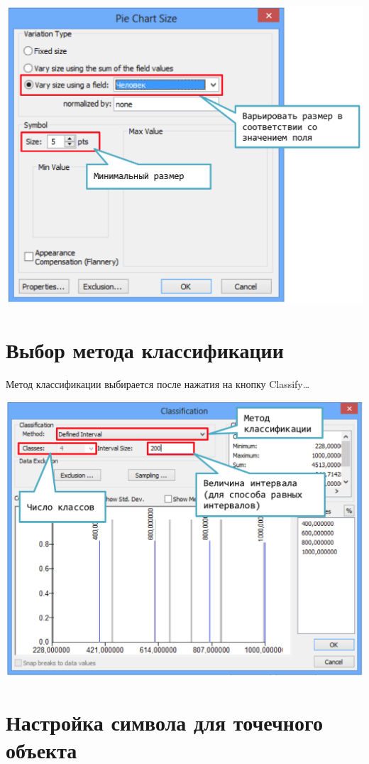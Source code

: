 \documentclass[]{book}
\theoremstyle{definition}
\theoremstyle{definition}
\theoremstyle{definition}
\theoremstyle{remark}
\begin{document}
\includegraphics{images/Appendix/image23.png}

\hypertarget{--}{%
\section{Выбор метода классификации}\label{--}}

Метод классификации выбирается после нажатия на кнопку Classify\ldots{}

\includegraphics{images/Appendix/image24.png}

\hypertarget{----}{%
\section{Настройка символа для точечного объекта}\label{----}}
\end{document}

